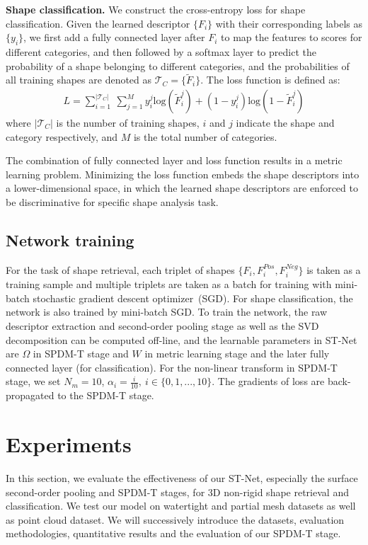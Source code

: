 \documentclass[runningheads]{llncs}
\begin{document}
\noindent
\textbf{Shape classification.} We construct the cross-entropy loss for shape classification. Given the learned descriptor $\{F_i\}$ with their corresponding labels as $\{y_i\}$, we first add a fully connected layer after ${F_i}$ to map the features to scores for different categories, and then followed by a softmax layer to predict the probability of a shape belonging to different categories, and the probabilities of all training shapes are denoted as $\mathcal{T}_C=\{\widetilde{F}_i\}$. The loss function is defined as:
\begin{equation}
\begin{split}
L = \sum_{i=1}^{|\mathcal{T}_C|}~\sum_{j=1}^{M}  y_i^j \text{log}(\widetilde{F}_i^j) + (1-y_i^j)\text{log}(1-\widetilde{F}_i^j)
\end{split}
\end{equation}
where $|\mathcal{T}_C|$ is the number of training shapes, $i$ and $j$ indicate the shape and category respectively, and $M$ is the total number of  categories. 


The combination of  fully connected layer and loss function results in  a metric learning problem. Minimizing the loss function embeds the shape descriptors into a lower-dimensional space, in which the learned shape descriptors are enforced to be discriminative for specific shape analysis task.

\subsection{Network training}
For the task of shape retrieval, each triplet of shapes $\{F_i, F_i^{Pos}, F_i^{Neg}\}$ is taken as a training sample and multiple triplets are taken as a batch for training with mini-batch stochastic gradient descent optimizer~(SGD). 
For shape classification, the network is also trained by mini-batch SGD. 
To train the network, the raw descriptor extraction and second-order pooling stage as well as the SVD decomposition can be computed off-line, and the learnable parameters in ST-Net are $\Omega$ in SPDM-T stage and $W$ in metric learning stage and the later fully connected layer (for classification). 
For the non-linear transform in  SPDM-T stage, we set ${N_m}=10$, $\alpha_i = \frac{i}{10},~i \in \{0,1,...,10\}$. The gradients of loss are back-propagated to the SPDM-T stage.

\section{Experiments}
In this section, we evaluate the effectiveness of our ST-Net, especially the surface second-order pooling and SPDM-T stages, for 3D non-rigid shape retrieval and classification. We test our model on watertight and partial mesh datasets as well as point cloud dataset. We will successively introduce the datasets, evaluation methodologies, quantitative results and the evaluation of our SPDM-T stage.
\end{document}
